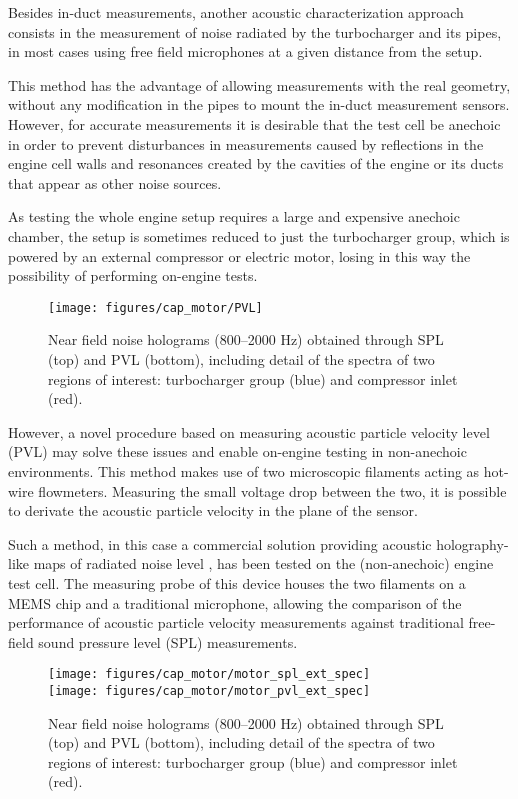 Besides in-duct measurements, another acoustic characterization approach consists in the measurement of noise radiated by the turbocharger and its pipes, in most cases using free field microphones at a given distance from the setup.

This method has the advantage of allowing measurements with the real geometry, without any modification in the pipes to mount the in-duct measurement sensors. However, for accurate measurements it is desirable that the test cell be anechoic in order to prevent disturbances in measurements caused by reflections in the engine cell walls and resonances created by the cavities of the engine or its ducts that appear as other noise sources.

As testing the whole engine setup requires a large and expensive anechoic chamber, the setup is sometimes reduced to just the turbocharger group, which is powered by an external compressor or electric motor, losing in this way the possibility of performing on-engine tests.

\begin{figure}[b!]
\centering
\texttt{[image: figures/cap\_motor/PVL]}
\caption{Near field noise holograms (800--2000 Hz) obtained through SPL (top) and PVL (bottom), including detail of the spectra of two regions of interest: turbocharger group (blue) and compressor inlet (red).}
\label{fig:PVL}
\end{figure}

However, a novel procedure based on measuring acoustic particle velocity level (PVL) may solve these issues \cite{jacobsen2005comparison} and enable on-engine testing in non-anechoic environments. This method makes use of two microscopic filaments acting as hot-wire flowmeters. Measuring the small voltage drop between the two, it is possible to derivate the acoustic particle velocity in the plane of the sensor.

Such a method, in this case a commercial solution providing acoustic holography-like maps of radiated noise level \cite{comesana2013scan}, has been tested on the (non-anechoic) engine test cell. The measuring probe of this device houses the two filaments on a MEMS chip and a traditional microphone, allowing the comparison of the performance of acoustic particle velocity measurements against traditional free-field sound pressure level (SPL) measurements.

\begin{figure}[tb!]
\centering
\texttt{[image: figures/cap\_motor/motor\_spl\_ext\_spec]}\\[5mm]
\texttt{[image: figures/cap\_motor/motor\_pvl\_ext\_spec]}
\caption{Near field noise holograms (800--2000 Hz) obtained through SPL (top) and PVL (bottom), including detail of the spectra of two regions of interest: turbocharger group (blue) and compressor inlet (red).}
\label{fig:PVL_spec_ext}
\end{figure}

